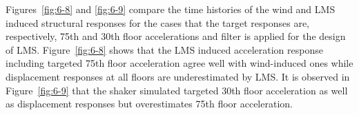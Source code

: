Figures~\ref{fig:6-8} and \ref{fig:6-9} compare the time histories of the wind and LMS induced structural responses for the cases that the target responses are, respectively, 75th and 30th floor accelerations and filter is applied for the design of LMS. Figure~\ref{fig:6-8} shows that the LMS induced acceleration response including targeted 75th floor acceleration agree well with wind-induced ones while displacement responses at all floors are underestimated by LMS. It is observed in Figure~\ref{fig:6-9} that the shaker simulated targeted 30th floor acceleration as well as displacement responses but overestimates 75th floor acceleration.

\begin{figure}[!ht]
\centering
{}
\end{figure}
